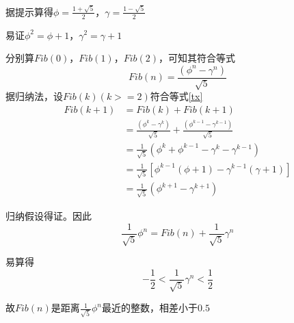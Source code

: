 \documentclass{ctexart}
\date{} %
\title{}
\author{}
\begin{document}
\maketitle


\noindent 据提示算得$\phi=\frac{1+\sqrt{5}}{2}$，$\gamma=\frac{1-\sqrt{5}}{2}$

\noindent 易证$\phi^2=\phi+1$，$\gamma^2=\gamma+1$

\noindent 分别算$Fib(0)$，$Fib(1)$，$Fib(2)$，可知其符合等式
\begin{equation}
Fib(n)=\frac{(\phi^n-\gamma^n)}{\sqrt{5}}\label{tx}
\end{equation}
据归纳法，设$Fib(k) (k>=2)$符合等式\ref{tx}
\begin{equation}
\begin{aligned}
Fib(k + 1)&=Fib(k)+Fib(k+1) \\
	&=\frac{(\phi^k-\gamma^k)}{\sqrt{5}} + \frac{(\phi^{k-1}-\gamma^{k-1})}{\sqrt{5}} \\
	&=\frac{1}{\sqrt{5}}\left(\phi^k+\phi^{k-1}-\gamma^k-\gamma^{k-1}\right) \\
	&=\frac{1}{\sqrt{5}}\left[\phi^{k-1}\left(\phi+1\right)-\gamma^{k-1}\left(\gamma+1\right)\right] \\
	&=\frac{1}{\sqrt{5}}\left(\phi^{k+1}-\gamma^{k+1}\right)
\end{aligned}
\end{equation}

\noindent 归纳假设得证。因此
\begin{equation}
\frac{1}{\sqrt{5}}\phi^n=Fib(n)+\frac{1}{\sqrt{5}}\gamma^n
\end{equation}

\noindent 易算得
\begin{equation}
-\frac{1}{2}<\frac{1}{\sqrt{5}}\gamma^n<\frac{1}{2}
\end{equation}

\noindent 故$Fib(n)$是距离$\frac{1}{\sqrt{5}}\phi^n$最近的整数，相差小于$0.5$
\end{document}
